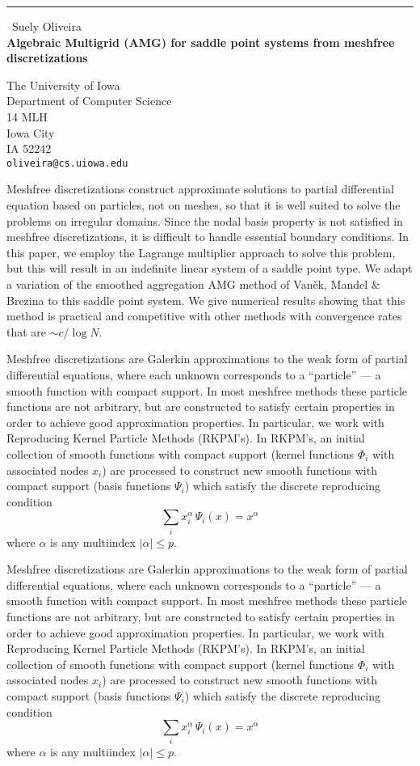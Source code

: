 \documentclass{report}
\begin{document}
\begin{center}
\rule{6in}{1pt} \
{\large Suely Oliveira \\
{\bf Algebraic Multigrid (AMG) for saddle point systems from meshfree discretizations}}

The University of Iowa \\ Department of Computer Science \\ 14 MLH \\ Iowa City \\ IA 52242
\\
{\tt oliveira@cs.uiowa.edu}\end{center}

Meshfree discretizations construct approximate solutions to partial
differential equation based on particles, not on meshes, so that it
is well suited to solve the problems on irregular domains. Since the
nodal basis property is not satisfied in meshfree discretizations,
it is difficult to handle essential boundary conditions. In this paper,
we employ the Lagrange multiplier approach to solve this problem,
but this will result in an indefinite linear system of a saddle point
type. We adapt a variation of the smoothed aggregation AMG method
of Van\v{e}k, Mandel \& Brezina to this saddle point system. We give
numerical results showing that this method is practical and competitive
with other methods with convergence rates that are $\sim c/\log N$.

Meshfree discretizations are Galerkin approximations to the weak form
of partial differential equations, where each unknown corresponds to a
``particle'' --- a smooth function with compact support. In most meshfree
methods these particle functions are not arbitrary, but are constructed
to satisfy certain properties in order to achieve good approximation
properties. In particular, we work with Reproducing Kernel Particle
Methods (RKPM's). In RKPM's, an initial collection of smooth functions
with compact support (kernel functions $\Phi_i$ with associated nodes $x_i$)
are processed to construct new smooth functions with compact support
(basis functions $\Psi_i$) which satisfy the discrete reproducing condition
\[ \sum_i x_i^\alpha \, \Psi_i(x) = x^\alpha \]
where $\alpha$ is any multiindex $|\alpha|\leq p$.

Meshfree discretizations are Galerkin approximations to the weak form
of partial differential equations, where each unknown corresponds to a
``particle'' --- a smooth function with compact support. In most meshfree
methods these particle functions are not arbitrary, but are constructed
to satisfy certain properties in order to achieve good approximation
properties. In particular, we work with Reproducing Kernel Particle
Methods (RKPM's). In RKPM's, an initial collection of smooth functions
with compact support (kernel functions $\Phi_i$ with associated nodes $x_i$)
are processed to construct new smooth functions with compact support
(basis functions $\Psi_i$) which satisfy the discrete reproducing condition
\[ \sum_i x_i^\alpha \, \Psi_i(x) = x^\alpha \]
where $\alpha$ is any multiindex $|\alpha|\leq p$.
\end{document}
